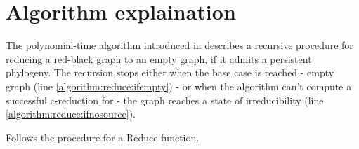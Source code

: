 
\section{Algorithm explaination}\label{section:algorithm}

The polynomial-time algorithm introduced in \cite{PPPptime2016} describes a recursive procedure for reducing a red-black graph to an empty graph, if it admits a persistent phylogeny.
The recursion stops either when the base case is reached - empty graph (line \ref{algorithm:reduce:ifempty}) - or when the algorithm can't compute a successful c-reduction for \grb{} - the graph reaches a state of irreducibility (line \ref{algorithm:reduce:ifnosource}).

Follows the procedure for a Reduce function.

